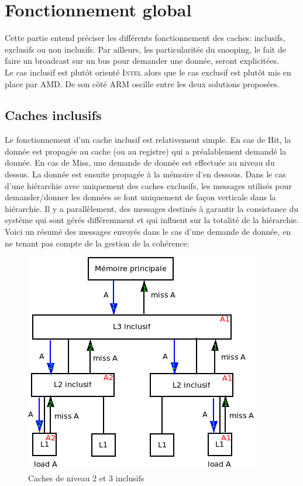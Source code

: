 \documentclass[a4paper]{article}
\begin{document}
\newpage
\section{Fonctionnement global}
\indent Cette partie entend préciser les différents fonctionnement des caches: inclusifs, exclusifs ou non inclusifs. Par ailleurs, les particularités du snooping, le fait de faire un broadcast sur un bus pour demander une donnée, seront explicitées. \\

\indent Le cas inclusif est plutôt orienté \textsc{Intel} alors que le cas exclusif est plutôt mis en place par \textsc{AMD}. De son côté \textsc{ARM} oscille entre les deux solutions proposées.

\subsection{Caches inclusifs}
\indent Le fonctionnement d'un cache inclusif est relativement simple. En cas de Hit, la donnée est propagée au cache (ou au registre) qui a préalablement demandé la donnée. En cas de Miss, une demande de donnée est effectuée au niveau du dessus. La donnée est ensuite propagée à la mémoire d'en dessous. Dans le cas d'une hiérarchie avec uniquement des caches exclusifs, les messages utilisés pour demander/donner les données se font uniquement de façon verticale dans la hiérarchie. Il y a parallèlement, des messages destinés à garantir la consistance du système qui sont gérés différemment et qui influent sur la totalité de la hiérarchie. Voici un résumé des messages envoyés dans le cas d'une demande de donnée, en ne tenant pas compte de la gestion de la cohérence: \\

\begin{figure}[!h]
\begin{center}
   \includegraphics[scale=0.7]{inclusifs.png}
   \caption{\label{inclusifs} Caches de niveau 2 et 3 inclusifs}
\end{center}
\end{figure}
\end{document}
